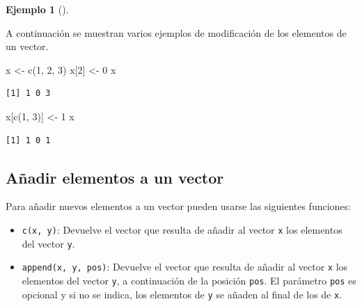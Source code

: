\documentclass[
  a4paper,
]{scrreport}
\newenvironment{Shaded}{\begin{snugshade}}{\end{snugshade}}
\newcommand{\DecValTok}[1]{\textcolor[rgb]{0.68,0.00,0.00}{#1}}
\newcommand{\FunctionTok}[1]{\textcolor[rgb]{0.28,0.35,0.67}{#1}}
\newcommand{\NormalTok}[1]{\textcolor[rgb]{0.00,0.23,0.31}{#1}}
\newcommand{\OtherTok}[1]{\textcolor[rgb]{0.00,0.23,0.31}{#1}}
\providecommand{\tightlist}{%
  \setlength{\itemsep}{0pt}\setlength{\parskip}{0pt}}\usepackage{longtable,booktabs,array}
\theoremstyle{definition}
\theoremstyle{definition}
\newtheorem{example}{Ejemplo}[chapter]
\theoremstyle{remark}
\begin{document}
\leavevmode{}%
\begin{example}[]\label{exm-modificacion-vectores}

A continuación se muestran varios ejemplos de modificación de los
elementos de un vector.

\begin{Shaded}
\begin{Highlighting}[]
\NormalTok{x }\OtherTok{\textless{}{-}} \FunctionTok{c}\NormalTok{(}\DecValTok{1}\NormalTok{, }\DecValTok{2}\NormalTok{, }\DecValTok{3}\NormalTok{)}
\NormalTok{x[}\DecValTok{2}\NormalTok{] }\OtherTok{\textless{}{-}} \DecValTok{0}
\NormalTok{x}
\end{Highlighting}
\end{Shaded}

\begin{verbatim}
[1] 1 0 3
\end{verbatim}

\begin{Shaded}
\begin{Highlighting}[]
\NormalTok{x[}\FunctionTok{c}\NormalTok{(}\DecValTok{1}\NormalTok{, }\DecValTok{3}\NormalTok{)] }\OtherTok{\textless{}{-}} \DecValTok{1}
\NormalTok{x}
\end{Highlighting}
\end{Shaded}

\begin{verbatim}
[1] 1 0 1
\end{verbatim}

\end{example}

\hypertarget{auxf1adir-elementos-a-un-vector}{%
\subsection{Añadir elementos a un
vector}\label{auxf1adir-elementos-a-un-vector}}

Para añadir nuevos elementos a un vector pueden usarse las siguientes
funciones:

\begin{itemize}
\tightlist
\item
  \texttt{c(x,\ y)}: Devuelve el vector que resulta de añadir al vector
  \texttt{x} los elementos del vector \texttt{y}.
\item
  \texttt{append(x,\ y,\ pos)}: Devuelve el vector que resulta de añadir
  al vector \texttt{x} los elementos del vector \texttt{y}, a
  continuación de la posición \texttt{pos}. El parámetro \texttt{pos} es
  opcional y si no se indica, los elementos de \texttt{y} se añaden al
  final de los de \texttt{x}.
\end{itemize}
\end{document}
